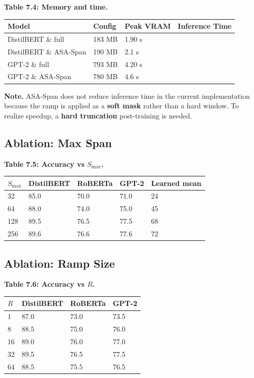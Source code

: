\textbf{Table 7.4: Memory and time.}

\begin{table}[H]
\centering
\small
\begin{tabular}{llll}
\toprule
\textbf{Model} & \textbf{Config} & \textbf{Peak VRAM} & \textbf{Inference Time} \\
\midrule
DistilBERT \& full & 183 MB & 1.90 s \\
DistilBERT \& ASA-Span & 190 MB & 2.1 s \\
GPT-2 \& full & 793 MB & 4.20 s \\
GPT-2 \& ASA-Span & 780 MB & 4.6 s \\
\bottomrule
\end{tabular}
\end{table}

\textbf{Note.} ASA-Span does not reduce inference time in the current implementation 
because the ramp is applied as a \textbf{soft mask} rather than a hard window. 
To realize speedup, a \textbf{hard truncation} post-training is needed.

\subsection{Ablation: Max Span}

\textbf{Table 7.5: Accuracy vs $S_\text{max}$.}

\begin{table}[H]
\centering
\small
\begin{tabular}{lllll}
\toprule
\textbf{$S_\text{max}$} & \textbf{DistilBERT} & \textbf{RoBERTa} & \textbf{GPT-2} & \textbf{Learned mean} \\
\midrule
32 & 85.0 & 70.0 & 71.0 & 24 \\
64 & 88.0 & 74.0 & 75.0 & 45 \\
128 & 89.5 & 76.5 & 77.5 & 68 \\
256 & 89.6 & 76.6 & 77.6 & 72 \\
\bottomrule
\end{tabular}
\end{table}

\subsection{Ablation: Ramp Size}

\textbf{Table 7.6: Accuracy vs $R$.}

\begin{table}[H]
\centering
\small
\begin{tabular}{llll}
\toprule
\textbf{$R$} & \textbf{DistilBERT} & \textbf{RoBERTa} & \textbf{GPT-2} \\
\midrule
1 & 87.0 & 73.0 & 73.5 \\
8 & 88.5 & 75.0 & 76.0 \\
16 & 89.0 & 76.0 & 77.0 \\
32 & 89.5 & 76.5 & 77.5 \\
64 & 88.5 & 75.5 & 76.5 \\
\bottomrule
\end{tabular}
\end{table}

